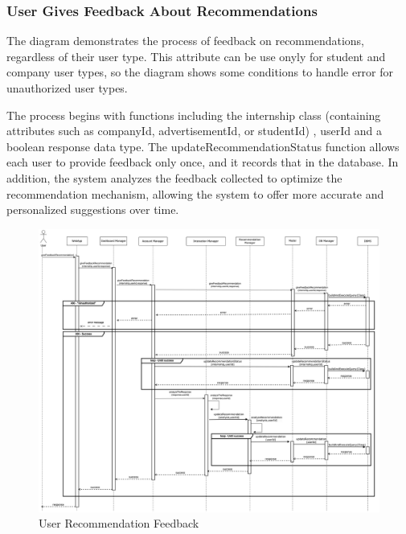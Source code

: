 \documentclass[a4paper,12pt]{article}
\begin{document}
\subsubsection*{ User Gives Feedback About Recommendations}  

The diagram demonstrates the process of feedback on recommendations, regardless of their user type. This attribute can be use onyly for student and company user types, so the diagram shows some conditions to handle error for unauthorized user types.

The process begins with functions including the internship class (containing attributes such as companyId, advertisementId, or studentId) , userId and a boolean response data type. The updateRecommendationStatus function allows each user to provide feedback only once, and it records that in the database. In addition, the system analyzes the feedback collected to optimize the recommendation mechanism, allowing the system to offer more accurate and personalized suggestions over time.
    \begin{figure}[H]
    \centering
    \includegraphics[scale = 0.25]{DD_figures/RuntimeView/userGiveFeedbackRecomm.drawio.png}
    \caption{User Recommendation Feedback}
\end{figure}

\newpage
\end{document}
